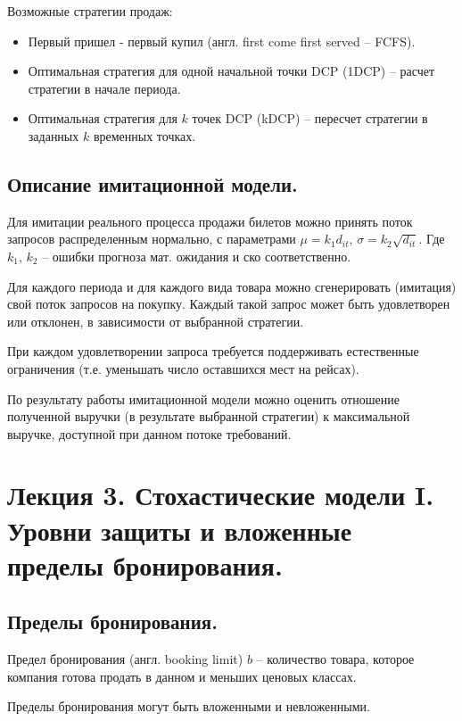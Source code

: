 \documentclass[reqno]{article}
\theoremstyle{definition}
\theoremstyle{definition}
\theoremstyle{definition}
\theoremstyle{definition}
\theoremstyle{definition}
\theoremstyle{definition}
\theoremstyle{definition}
\theoremstyle{definition}
\theoremstyle{definition}
\begin{document}
		Возможные стратегии продаж:
		\begin{itemize}
			\item Первый пришел - первый купил (англ. first come first served -- FCFS).
			\item Оптимальная стратегия для одной начальной точки DCP (1DCP) -- расчет стратегии в начале периода.
			\item Оптимальная стратегия для $k$ точек DCP (kDCP) -- пересчет стратегии в заданных $k$ временных точках.
		\end{itemize}
	
	
		\subsection{Описание имитационной модели.}
		
		
		Для имитации реального процесса продажи билетов можно принять поток запросов распределенным нормально, с параметрами $\mu = k_1 d_{i t}$, $\sigma = k_2 \sqrt{d_{i t}}$. Где $k_1$, $k_2$ -- ошибки прогноза мат. ожидания и ско соответственно.
		
		Для каждого периода и для каждого вида товара можно сгенерировать (имитация) свой поток запросов на покупку. Каждый такой запрос может быть удовлетворен или отклонен, в зависимости от выбранной стратегии.
		
		При каждом удовлетворении запроса требуется поддерживать естественные ограничения (т.е. уменьшать число оставшихся мест на рейсах).
		
		По результату работы имитационной модели можно оценить отношение полученной выручки (в результате выбранной стратегии) к максимальной выручке, доступной при данном потоке требований.
			
		
		
		\newpage
		\section{Лекция 3. Стохастические модели I. Уровни защиты и вложенные пределы бронирования.}
		
		
		\subsection{Пределы бронирования.}
				
		Предел бронирования (англ. booking limit) $b$ -- количество товара, которое компания готова продать в данном и меньших ценовых классах.
	
		Пределы бронирования могут быть вложенными и невложенными.
		
\end{document}
